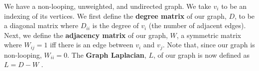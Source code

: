 We have a non-looping, unweighted, and undirected graph. We take $v_i$ to be an indexing of its vertices.
We first define the \textbf{degree matrix} of our graph, $D$, to be a diagonal matrix where $D_{ii}$ is the degree of $v_i$ (the number of adjacent edges).
Next, we define the \textbf{adjacency matrix} of our graph, $W$, a symmetric matrix where $W_{ij}=1$ iff there is an edge between $v_i$ and $v_j$. Note that, since our graph is non-looping, $W_{ii}=0$.
The \textbf{Graph Laplacian}, $L$, of our graph is now defined as $L=D-W$ \cite{weisstein}.